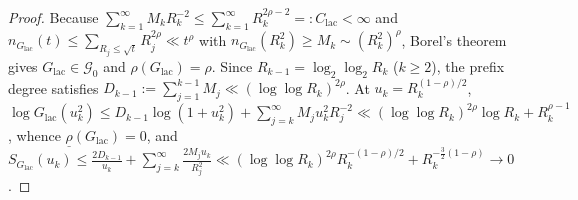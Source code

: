 \documentclass[11pt,a4paper,reqno]{amsart}
\theoremstyle{definition}
\theoremstyle{remark}
\numberwithin{equation}{section}
\begin{document}
\begin{proof}
Because $\sum_{k=1}^{\infty} M_k R_k^{-2} \le \sum_{k=1}^{\infty} R_k^{2\rho - 2} =: C_{\mathrm{lac}} < \infty$ and $n_{G_{\mathrm{lac}}}(t) \le \sum_{R_j \le \sqrt{t}} R_j^{2\rho} \ll t^\rho$ with $n_{G_{\mathrm{lac}}}(R_k^2) \ge M_k \sim (R_k^2)^\rho$, Borel's theorem \cite[Thm.~2.6.5]{boas1954} gives $G_{\mathrm{lac}} \in \mathcal{G}_0$ and $\rho(G_{\mathrm{lac}}) = \rho$. Since $R_{k-1} = \log_2\log_2 R_k$ ($k \ge 2$), the prefix degree satisfies $D_{k-1} := \sum_{j=1}^{k-1} M_j \ll (\log\log R_k)^{2\rho}$. At $u_k = R_k^{(1-\rho)/2}$, $\log G_{\mathrm{lac}}(u_k^2) \le D_{k-1}\log(1 + u_k^2) + \sum_{j=k}^{\infty} M_j u_k^2 R_j^{-2} \ll (\log\log R_k)^{2\rho}\log R_k + R_k^{\rho - 1}$, whence $\underline{\rho}(G_{\mathrm{lac}}) = 0$, and $S_{G_{\mathrm{lac}}}(u_k) \le \frac{2 D_{k-1}}{u_k} + \sum_{j=k}^{\infty}\frac{2 M_j u_k}{R_j^2} \ll (\log\log R_k)^{2\rho}R_k^{-(1-\rho)/2} + R_k^{-\frac{3}{2}(1-\rho)} \to 0$.


\end{proof}
\end{document}
